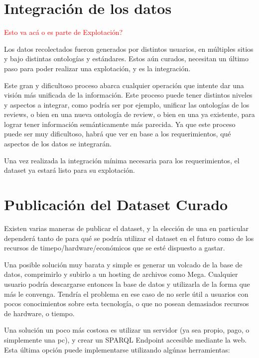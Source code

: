%

\section{Integración de los datos}
\begin{framed}
\textcolor{red}{Esto va acá o es parte de Explotación?}
\end{framed}


Los datos recolectados fueron generados por distintos usuarios, en múltiples sitios y bajo distintas ontologías y estándares.
Estos aún curados, necesitan un último paso para poder realizar una explotación, y es la integración.

Este gran y dificultoso proceso abarca cualquier operación que intente dar una visión más unificada de la información. Este
proceso puede tener distintos niveles y aspectos a integrar, como podría ser por ejemplo, unificar las ontologías de los reviews, o bien
en una nueva ontología de review, o bien en una ya existente, para lograr tener información semánticamente más parecida. Ya 
que este proceso puede ser muy dificultoso, habrá que ver en base a los requerimientos, qué aspectos de los datos se integrarán.

Una vez realizada la integración mínima necesaria para los requerimientos, el dataset ya estará listo para su explotación.

\section{Publicación del Dataset Curado}

Existen varias maneras de publicar el dataset, y la elección de una en particular dependerá tanto de para qué se podría utilizar el dataset en el futuro como
de los recursos de timepo/hardware/económicos que se esté dispuesto a gastar.

Una posible solución muy barata y simple es generar un volcado de la base de datos, comprimirlo y subirlo a un hosting de archivos como Mega. Cualquier usuario podría descargarse entonces la base de datos y utilizarla de la forma que más le convenga.
Tendría el problema en ese caso de no serle útil a usuarios con pocos conocimientos sobre esta tecnología, o que no posean demasiados recursos de hardware, o tiempo.

Una solución un poco más costosa es utilizar un servidor (ya sea propio, pago, o simplemente una pc), y crear un SPARQL Endpoint accesible mediante la web.
Esta última opción puede implementarse utilizando algúnas herramientas:

